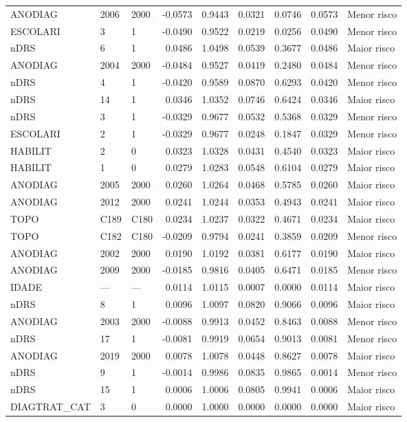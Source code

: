 \begin{table}
\begin{tabular}{lllrrrrrl}
ANODIAG & 2006 & 2000 & -0.0573 & 0.9443 & 0.0321 & 0.0746 & 0.0573 & Menor risco \\
ESCOLARI & 3 & 1 & -0.0490 & 0.9522 & 0.0219 & 0.0256 & 0.0490 & Menor risco \\
nDRS & 6 & 1 & 0.0486 & 1.0498 & 0.0539 & 0.3677 & 0.0486 & Maior risco \\
ANODIAG & 2004 & 2000 & -0.0484 & 0.9527 & 0.0419 & 0.2480 & 0.0484 & Menor risco \\
nDRS & 4 & 1 & -0.0420 & 0.9589 & 0.0870 & 0.6293 & 0.0420 & Menor risco \\
nDRS & 14 & 1 & 0.0346 & 1.0352 & 0.0746 & 0.6424 & 0.0346 & Maior risco \\
nDRS & 3 & 1 & -0.0329 & 0.9677 & 0.0532 & 0.5368 & 0.0329 & Menor risco \\
ESCOLARI & 2 & 1 & -0.0329 & 0.9677 & 0.0248 & 0.1847 & 0.0329 & Menor risco \\
HABILIT & 2 & 0 & 0.0323 & 1.0328 & 0.0431 & 0.4540 & 0.0323 & Maior risco \\
HABILIT & 1 & 0 & 0.0279 & 1.0283 & 0.0548 & 0.6104 & 0.0279 & Maior risco \\
ANODIAG & 2005 & 2000 & 0.0260 & 1.0264 & 0.0468 & 0.5785 & 0.0260 & Maior risco \\
ANODIAG & 2012 & 2000 & 0.0241 & 1.0244 & 0.0353 & 0.4943 & 0.0241 & Maior risco \\
TOPO & C189 & C180 & 0.0234 & 1.0237 & 0.0322 & 0.4671 & 0.0234 & Maior risco \\
TOPO & C182 & C180 & -0.0209 & 0.9794 & 0.0241 & 0.3859 & 0.0209 & Menor risco \\
ANODIAG & 2002 & 2000 & 0.0190 & 1.0192 & 0.0381 & 0.6177 & 0.0190 & Maior risco \\
ANODIAG & 2009 & 2000 & -0.0185 & 0.9816 & 0.0405 & 0.6471 & 0.0185 & Menor risco \\
IDADE & — & — & 0.0114 & 1.0115 & 0.0007 & 0.0000 & 0.0114 & Maior risco \\
nDRS & 8 & 1 & 0.0096 & 1.0097 & 0.0820 & 0.9066 & 0.0096 & Maior risco \\
ANODIAG & 2003 & 2000 & -0.0088 & 0.9913 & 0.0452 & 0.8463 & 0.0088 & Menor risco \\
nDRS & 17 & 1 & -0.0081 & 0.9919 & 0.0654 & 0.9013 & 0.0081 & Menor risco \\
ANODIAG & 2019 & 2000 & 0.0078 & 1.0078 & 0.0448 & 0.8627 & 0.0078 & Maior risco \\
nDRS & 9 & 1 & -0.0014 & 0.9986 & 0.0835 & 0.9865 & 0.0014 & Menor risco \\
nDRS & 15 & 1 & 0.0006 & 1.0006 & 0.0805 & 0.9941 & 0.0006 & Maior risco \\
DIAGTRAT_CAT & 3 & 0 & 0.0000 & 1.0000 & 0.0000 & 0.0000 & 0.0000 & Maior risco \\
\bottomrule
\end{tabular}
\end{table}
